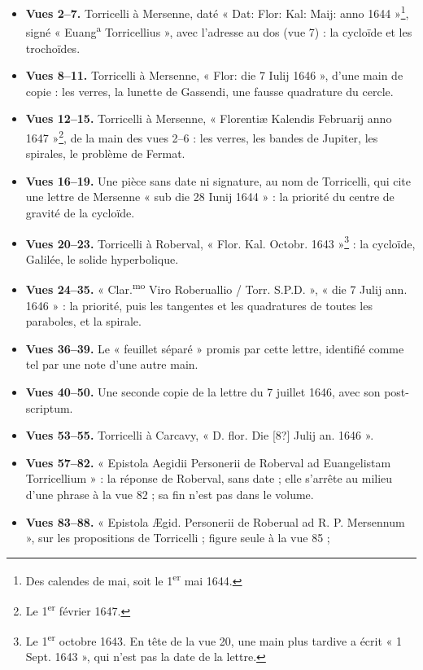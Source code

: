 \documentclass[11pt,a4paper]{article}
\begin{document}
\begin{itemize}
  \item \textbf{Vues 2--7.} Torricelli à Mersenne, daté « Dat: Flor: Kal: Maij:
    anno 1644 »\footnote{Des calendes de mai, soit le 1\textsuperscript{er} mai
    1644.}, signé « Euang\textsuperscript{a} Torricellius », avec l'adresse au
    dos (vue 7) : la cycloïde et les trochoïdes.
  \item \textbf{Vues 8--11.} Torricelli à Mersenne, « Flor: die 7 Iulij 1646 »,
    d'une main de copie : les verres, la lunette de Gassendi, une fausse
    quadrature du cercle.
  \item \textbf{Vues 12--15.} Torricelli à Mersenne, « Florentiæ Kalendis
    Februarij anno 1647 »\footnote{Le 1\textsuperscript{er} février 1647.}, de
    la main des vues 2--6 : les verres, les bandes de Jupiter, les spirales, le
    problème de Fermat.
  \item \textbf{Vues 16--19.} Une pièce sans date ni signature, au nom de
    Torricelli, qui cite une lettre de Mersenne « sub die 28 Iunij 1644 » :
    la priorité du centre de gravité de la cycloïde.
  \item \textbf{Vues 20--23.} Torricelli à Roberval, « Flor. Kal. Octobr.
    1643 »\footnote{Le 1\textsuperscript{er} octobre 1643. En tête de la vue 20,
    une main plus tardive a écrit « 1 Sept. 1643 », qui n'est pas la date de la
    lettre.} : la cycloïde, Galilée, le solide hyperbolique.
  \item \textbf{Vues 24--35.} « Clar.\textsuperscript{mo} Viro Roberuallio /
    Torr. S.P.D. », « die 7 Julij ann. 1646 » : la priorité, puis les tangentes
    et les quadratures de toutes les paraboles, et la spirale.
  \item \textbf{Vues 36--39.} Le « feuillet séparé » promis par cette lettre,
    identifié comme tel par une note d'une autre main.
  \item \textbf{Vues 40--50.} Une seconde copie de la lettre du 7 juillet 1646,
    avec son post-scriptum.
  \item \textbf{Vues 53--55.} Torricelli à Carcavy, « D. flor. Die [8?] Julij an.
    1646 ».
  \item \textbf{Vues 57--82.} « Epistola Aegidii Personerii de Roberval ad
    Euangelistam Torricellium » : la réponse de Roberval, sans date ; elle
    s'arrête au milieu d'une phrase à la vue 82 ; sa fin n'est pas dans le
    volume.
  \item \textbf{Vues 83--88.} « Epistola Ægid. Personerii de Roberual ad R. P.
    Mersennum », sur les propositions de Torricelli ; figure seule à la vue 85 ;

\end{itemize}
\end{document}
